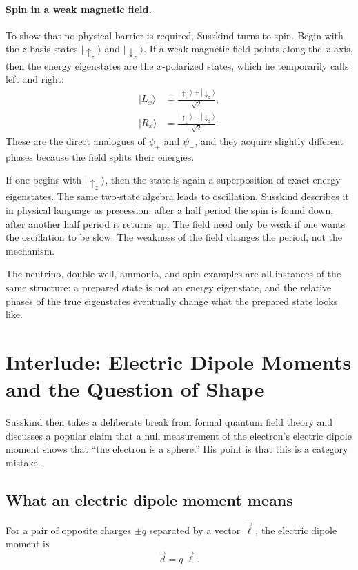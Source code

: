 \paragraph{Spin in a weak magnetic field.}
To show that no physical barrier is required, Susskind turns to spin. Begin with the \(z\)-basis states \(|\uparrow_z\rangle\) and \(|\downarrow_z\rangle\). If a weak magnetic field points along the \(x\)-axis, then the energy eigenstates are the \(x\)-polarized states, which he temporarily calls left and right:
\begin{align}
|L_x\rangle &= \frac{|\uparrow_z\rangle + |\downarrow_z\rangle}{\sqrt{2}},\\
|R_x\rangle &= \frac{|\uparrow_z\rangle - |\downarrow_z\rangle}{\sqrt{2}}.
\end{align}
These are the direct analogues of \(\psi_+\) and \(\psi_-\), and they acquire slightly different phases because the field splits their energies.

If one begins with \(|\uparrow_z\rangle\), then the state is again a superposition of exact energy eigenstates. The same two-state algebra leads to oscillation. Susskind describes it in physical language as precession: after a half period the spin is found down, after another half period it returns up. The field need only be weak if one wants the oscillation to be slow. The weakness of the field changes the period, not the mechanism.

The neutrino, double-well, ammonia, and spin examples are all instances of the same structure: a prepared state is not an energy eigenstate, and the relative phases of the true eigenstates eventually change what the prepared state looks like.

\section{Interlude: Electric Dipole Moments and the Question of Shape}

Susskind then takes a deliberate break from formal quantum field theory and discusses a popular claim that a null measurement of the electron's electric dipole moment shows that ``the electron is a sphere.'' His point is that this is a category mistake.

\subsection{What an electric dipole moment means}

\begin{definition}
For a pair of opposite charges \(\pm q\) separated by a vector \(\vec{\ell}\), the electric dipole moment is
\begin{equation}
\vec d = q\,\vec{\ell}.
\end{equation}
\end{definition}

